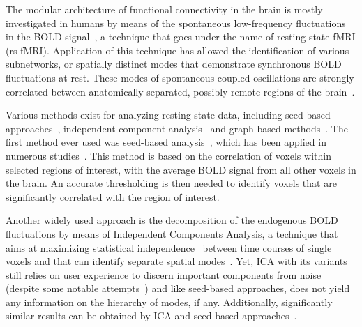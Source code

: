 The modular architecture of functional connectivity in the brain is mostly investigated in humans by means of the spontaneous low-frequency fluctuations in the BOLD signal~\cite{biswal1995}, a technique that goes under the name of resting state fMRI (rs-fMRI).
Application of this technique has allowed the identification of various subnetworks, or spatially distinct modes that demonstrate synchronous BOLD fluctuations at rest. These modes of spontaneous coupled oscillations are strongly correlated between anatomically separated, possibly remote regions of the brain~\cite{biswal1995,raichle2001,fox2005,biswal2012}.

Various methods exist for analyzing resting-state data, including seed-based approaches~\cite{biswal1995,raichle2001}, independent component analysis~\cite{beckmann2005,damoiseaux2006} and graph-based methods~\cite{stam2007,bullmore2009}.
The first method ever used was seed-based analysis~\cite{biswal1995}, which has been applied in numerous studies~\cite{raichle2001}.
This method is based on the correlation of voxels within selected regions of interest, with the average BOLD signal from all other voxels in the brain.
An accurate thresholding is then needed to identify voxels that are significantly correlated with the region of interest.

Another widely used approach is the decomposition of the endogenous BOLD fluctuations by means of Independent Components Analysis, a technique that aims at maximizing statistical independence~\cite{calhoun2013} between time courses of single voxels and that can identify separate spatial modes~\cite{damoiseaux2006,beckmann2005}. Yet, ICA with its variants still relies on user experience to discern important components from noise~\cite{lee2013} (despite some notable attempts~\cite{thomas2002,tohka2008}) and like seed-based approaches, does not yield any information on the hierarchy of modes, if any.
Additionally, significantly similar results can be obtained by ICA and seed-based approaches~\cite{rosazza2012}.


